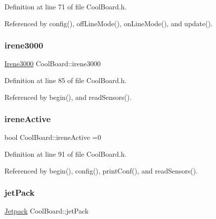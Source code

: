 Definition at line 71 of file Cool\+Board.\+h.



Referenced by config(), off\+Line\+Mode(), on\+Line\+Mode(), and update().

\mbox{\label{classCoolBoard_ad103718ce316006c4695b8eb312eaf11}} 
\subsubsection{\texorpdfstring{irene3000}{irene3000}}
{\footnotesize\ttfamily \hyperlink{classIrene3000}{Irene3000} Cool\+Board\+::irene3000\hspace{0.3cm}{\ttfamily [private]}}



Definition at line 85 of file Cool\+Board.\+h.



Referenced by begin(), and read\+Sensors().

\mbox{\label{classCoolBoard_a9c3f7ac625481ee2ae802a25d97a4ae0}} 
\subsubsection{\texorpdfstring{irene\+Active}{ireneActive}}
{\footnotesize\ttfamily bool Cool\+Board\+::irene\+Active =0\hspace{0.3cm}{\ttfamily [private]}}



Definition at line 91 of file Cool\+Board.\+h.



Referenced by begin(), config(), print\+Conf(), and read\+Sensors().

\mbox{\label{classCoolBoard_a30b1357881b01ccbec676856a91e48e9}} 
\subsubsection{\texorpdfstring{jet\+Pack}{jetPack}}
{\footnotesize\ttfamily \hyperlink{classJetpack}{Jetpack} Cool\+Board\+::jet\+Pack\hspace{0.3cm}{\ttfamily [private]}}



